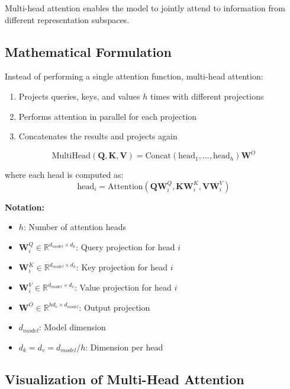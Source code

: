\documentclass[11pt]{article}
\begin{document}
Multi-head attention enables the model to jointly attend to information from different representation subspaces.

\subsection{Mathematical Formulation}

Instead of performing a single attention function, multi-head attention:
\begin{enumerate}
    \item Projects queries, keys, and values $h$ times with different projections
    \item Performs attention in parallel for each projection
    \item Concatenates the results and projects again
\end{enumerate}

\begin{equation}
\text{MultiHead}(\mathbf{Q}, \mathbf{K}, \mathbf{V}) = \text{Concat}(\text{head}_1, ..., \text{head}_h)\mathbf{W}^O
\end{equation}

where each head is computed as:
\begin{equation}
\text{head}_i = \text{Attention}(\mathbf{Q}\mathbf{W}_i^Q, \mathbf{K}\mathbf{W}_i^K, \mathbf{V}\mathbf{W}_i^V)
\end{equation}
\begin{notationbox}
\textbf{Notation:}
\begin{itemize}
    \item $h$: Number of attention heads
    \item $\mathbf{W}_i^Q \in \mathbb{R}^{d_{model} \times d_k}$: Query projection for head $i$
    \item $\mathbf{W}_i^K \in \mathbb{R}^{d_{model} \times d_k}$: Key projection for head $i$
    \item $\mathbf{W}_i^V \in \mathbb{R}^{d_{model} \times d_v}$: Value projection for head $i$
    \item $\mathbf{W}^O \in \mathbb{R}^{hd_v \times d_{model}}$: Output projection
    \item $d_{model}$: Model dimension
    \item $d_k = d_v = d_{model}/h$: Dimension per head
\end{itemize}
\end{notationbox}

\subsection{Visualization of Multi-Head Attention}
\end{document}
